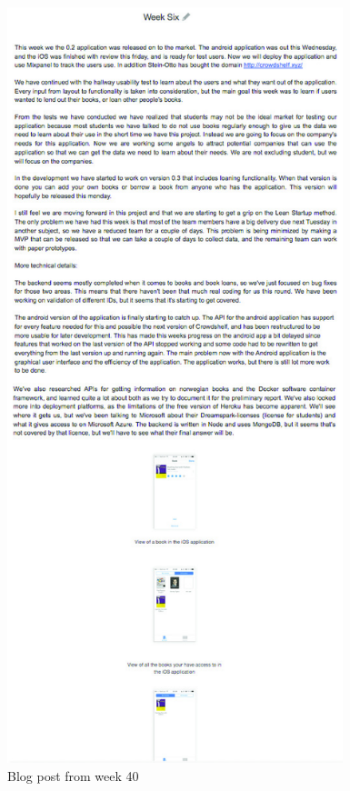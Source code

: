 \begin{figure}
\centering
\includegraphics[height=22cm]{figs/v03/WeekSix.jpg}
\caption{Blog post from week 40}
\label{fig:week-six}
\end{figure}

